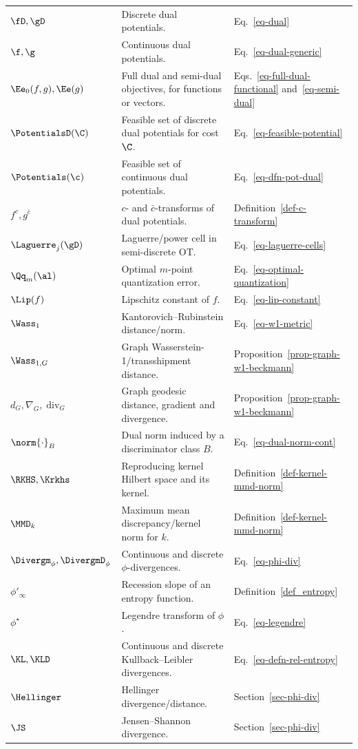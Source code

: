 {\begin{longtable}{>{\raggedright\arraybackslash}p{}
                  >{\raggedright\arraybackslash}p{}
                  >{\raggedright\arraybackslash}p{}}
\hline
\multicolumn{3}{l}{\textbf{Duality, transforms and weak norms}}\\
\hline
$\fD,\gD$ & Discrete dual potentials. & Eq.~\eqref{eq-dual} \\
$\f,\g$ & Continuous dual potentials. & Eq.~\eqref{eq-dual-generic} \\
$\Ee_0(f,g),\Ee(g)$ & Full dual and semi-dual objectives, for functions or vectors. & Eqs.~\eqref{eq-full-dual-functional} and~\eqref{eq-semi-dual} \\
$\PotentialsD(\C)$ & Feasible set of discrete dual potentials for cost $\C$. & Eq.~\eqref{eq-feasible-potential} \\
$\Potentials(\c)$ & Feasible set of continuous dual potentials. & Eq.~\eqref{eq-dfn-pot-dual} \\
$f^c,g^{\bar c}$ & $c$- and $\bar c$-transforms of dual potentials. & Definition~\ref{def-c-transform} \\
$\Laguerre_j(\gD)$ & Laguerre/power cell in semi-discrete OT. & Eq.~\eqref{eq-laguerre-cells} \\
$\Qq_m(\al)$ & Optimal $m$-point quantization error. & Eq.~\eqref{eq-optimal-quantization} \\
$\Lip(f)$ & Lipschitz constant of $f$. & Eq.~\eqref{eq-lip-constant} \\
$\Wass_1$ & Kantorovich--Rubinstein distance/norm. & Eq.~\eqref{eq-w1-metric} \\
$\Wass_{1,G}$ & Graph Wasserstein-1/transshipment distance. & Proposition~\ref{prop-graph-w1-beckmann} \\
$d_G,\nabla_G,\operatorname{div}_G$ & Graph geodesic distance, gradient and divergence. & Proposition~\ref{prop-graph-w1-beckmann} \\
$\norm{\cdot}_B$ & Dual norm induced by a discriminator class $B$. & Eq.~\eqref{eq-dual-norm-cont} \\
$\RKHS,\Krkhs$ & Reproducing kernel Hilbert space and its kernel. & Definition~\ref{def-kernel-mmd-norm} \\
$\MMD_k$ & Maximum mean discrepancy/kernel norm for $k$. & Definition~\ref{def-kernel-mmd-norm} \\
$\Divergm_\phi,\DivergmD_\phi$ & Continuous and discrete $\phi$-divergences. & Eq.~\eqref{eq-phi-div} \\
$\phi'_\infty$ & Recession slope of an entropy function. & Definition~\ref{def_entropy} \\
$\phi^\star$ & Legendre transform of $\phi$. & Eq.~\eqref{eq-legendre} \\
$\KL,\KLD$ & Continuous and discrete Kullback--Leibler divergences. & Eq.~\eqref{eq-defn-rel-entropy} \\
$\Hellinger$ & Hellinger divergence/distance. & Section~\ref{sec-phi-div} \\
$\JS$ & Jensen--Shannon divergence. & Section~\ref{sec-phi-div} \\


\end{longtable}}
